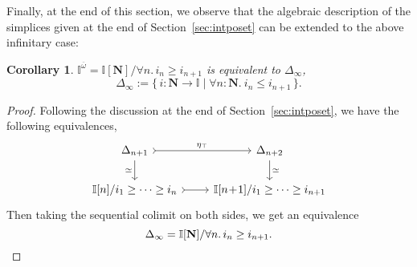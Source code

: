 \documentclass[12pt]{amsart}
\newtheorem{lemma}[theorem]{Lemma}
\newtheorem{corollary}[theorem]{Corollary}
\theoremstyle{definition}
\newtheorem{definition}[theorem]{Definition}
\newcommand{\mb}[1]{\mathbf{#1}}
\newcommand{\mbb}[1]{\mathbb{#1}}
\newcommand{\I}{\mbb I}
\newcommand{\ov}[1]{\overline{#1}}
\newcommand{\scomp}[2]{\{\,#1\mid#2\,\}}
\newcommand{\N}{\mb N}
\newcommand{\cprt}{_{\top}}
\newcommand{\fa}[2]{\forall #1\!\colon\!\!#2.\ }
\begin{document}
Finally, at the end of this section, we observe that the algebraic description of the simplices given at the end of Section~\ref{sec:intposet} can be extended to the above infinitary case:

\begin{corollary}
  $\I^{\ov\omega} = \I[\N]/\forall n.\, i_n \ge i_{n+1}$ is equivalent to $\Delta_\infty$, 
  \[ \Delta_\infty := \scomp{i : \N \to \I}{\fa n\N i_n \le i_{n+1}}. \]
\end{corollary}
\begin{proof}
  Following the discussion at the end of Section~\ref{sec:intposet}, we have the following equivalences,
  \[
    \begin{tikzcd}
      \Delta_{n+1} \ar[r, tail, "\eta\cprt"] \ar[d, "\simeq"'] & \Delta_{n+2}  \ar[d, "\simeq"] \\ 
      \I[n]/i_1 \ge \cdots \ge i_n \ar[r, tail] & \I[n\!+\!1]/i_1 \ge \cdots \ge i_{n+1} 
    \end{tikzcd}
  \]
  Then taking the sequential colimit on both sides, we get an equivalence
  \[ \Delta_{\infty} = \I[\N]/\forall n.\, i_n \ge i_{n+1}. \qedhere \]
\end{proof}







\end{document}

